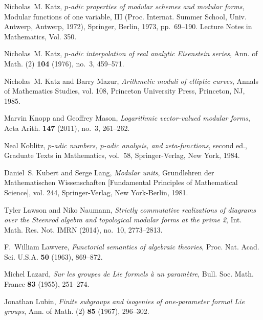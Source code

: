 \documentclass{gtpart}
\theoremstyle{definition}
\theoremstyle{remark}
\renewcommand{\=}{\approx}
\renewcommand{\-}{\sim}
\numberwithin{equation}{section}
\begin{document}
\begin{thebibliography}
Nicholas~M. Katz, \emph{{$p$}-adic properties of modular schemes and modular
  forms}, Modular functions of one variable, {III} ({P}roc. {I}nternat.
  {S}ummer {S}chool, {U}niv. {A}ntwerp, {A}ntwerp, 1972), Springer, Berlin,
  1973, pp.~69--190. Lecture Notes in Mathematics, Vol. 350. 

Nicholas~M. Katz, \emph{{$p$}-adic interpolation of real analytic {E}isenstein 
  series}, Ann. of Math. (2) \textbf{104} (1976), no.~3, 459--571. 

Nicholas~M. Katz and Barry Mazur, \emph{Arithmetic moduli of elliptic curves},
  Annals of Mathematics Studies, vol. 108, Princeton University Press,
  Princeton, NJ, 1985. 

Marvin Knopp and Geoffrey Mason, \emph{Logarithmic vector-valued modular
  forms}, Acta Arith. \textbf{147} (2011), no.~3, 261--262. 

Neal Koblitz, \emph{{$p$}-adic numbers, {$p$}-adic analysis, and
  zeta-functions}, second ed., Graduate Texts in Mathematics, vol.~58,
  Springer-Verlag, New York, 1984. 

Daniel~S. Kubert and Serge Lang, \emph{Modular units}, Grundlehren der
  Mathematischen Wissenschaften [Fundamental Principles of Mathematical
  Science], vol. 244, Springer-Verlag, New York-Berlin, 1981. 

Tyler Lawson and Niko Naumann, \emph{Strictly commutative realizations of
  diagrams over the {S}teenrod algebra and topological modular forms at the
  prime 2}, Int. Math. Res. Not. IMRN (2014), no.~10, 2773--2813. 

F.~William Lawvere, \emph{Functorial semantics of algebraic theories}, Proc.
  Nat. Acad. Sci. U.S.A. \textbf{50} (1963), 869--872. 

Michel Lazard, \emph{Sur les groupes de {L}ie formels \`a un param\`etre},
  Bull. Soc. Math. France \textbf{83} (1955), 251--274. 

Jonathan Lubin, \emph{Finite subgroups and isogenies of one-parameter formal
  {L}ie groups}, Ann. of Math. (2) \textbf{85} (1967), 296--302. 


\end{thebibliography}
\end{document}
